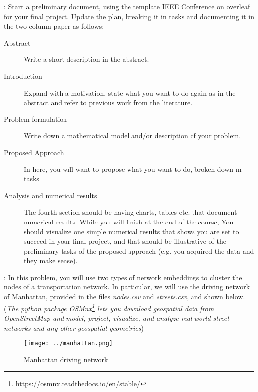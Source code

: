 \documentclass[11pt]{exam}
\begin{document}
\begin{questions}
:
Start a preliminary document, using the template \href{https://www.overleaf.com/latex/templates/ieee-conference-template/grfzhhncsfqn}{IEEE Conference on overleaf} for your final project.  
Update the plan, breaking it in tasks and documenting it in the two column paper as follows: 
\begin{description}
\item[Abstract] Write a short description in the abstract. 
\item[Introduction] Expand with a motivation, state what you want to do again as in the abstract and refer to previous work from the literature. 
\item[Problem formulation] Write down a mathematical model and/or description of your problem.
\item[Proposed Approach] In here, you will want to propose what you want to do, broken down in tasks
\item[Analysis and numerical results] The fourth section should be having charts, tables etc. that document numerical results. While you will finish at the end of the course, You should visualize one simple numerical results that shows you are set to succeed in your final project, and that should be illustrative of the preliminary tasks of the proposed approach (e.g. you acquired the data and they make sense).  
\end{description}
\newpage
{}: In this problem, you will use two types of network embeddings to cluster the nodes of a transportation network. In particular, we will use the driving network of Manhattan, provided in the files \textit{nodes.csv} and \textit{streets.csv}, and shown below. (\textit{The python package OSMnx\footnote{https://osmnx.readthedocs.io/en/stable/}  lets you download geospatial data from OpenStreetMap and model, project, visualize, and analyze real-world street networks and any other geospatial geometries})
\begin{figure}[ht]
  \centering
  \texttt{[image: ../manhattan.png]}
  \vspace{-1cm}
  \caption{Manhattan driving network}
  \label{fig:manhattan}
\end{figure}
\end{questions}
\end{document}
